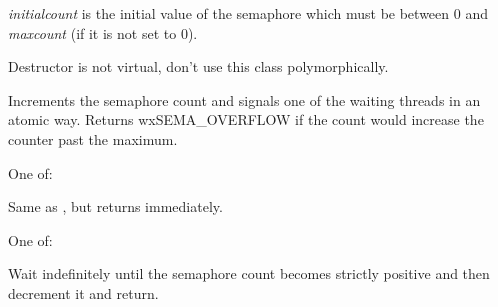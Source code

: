 {\it initialcount} is the initial value of the semaphore which must be between
$0$ and {\it maxcount} (if it is not set to $0$).

\label{wxsemaphoredtor}


Destructor is not virtual, don't use this class polymorphically.

\label{wxsemaphorepost}


Increments the semaphore count and signals one of the waiting
threads in an atomic way. Returns wxSEMA\_OVERFLOW if the count
would increase the counter past the maximum.


One of:

\twocolwidtha{7cm}
\begin{twocollist}\itemsep=0pt
\end{twocollist}


\label{wxsemaphoretrywait}


Same as , but returns immediately.


One of:

\twocolwidtha{7cm}
\begin{twocollist}\itemsep=0pt
\end{twocollist}


\label{wxsemaphorewait}


Wait indefinitely until the semaphore count becomes strictly positive
and then decrement it and return.

